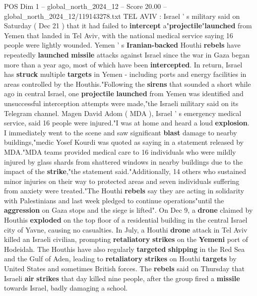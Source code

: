 \begin{textsample}{POS Dim 1 – global\_north\_2024\_12 – Score 20.00 – global\_north\_2024\_12/119143278.txt}  \label{ex:f1_pos_268}
TEL AVIV : Israel ' s military said on Saturday ( Dec 21 ) that it had failed to \textbf{intercept} a"\textbf{projectile}"\textbf{launched} from Yemen that landed in Tel Aviv, with the national medical service saying 16 people were lightly wounded.
Yemen ' s \textbf{Iranian-backed} Houthi \textbf{rebels} have repeatedly \textbf{launched} \textbf{missile} attacks against Israel since the war in Gaza began more than a year ago, most of which have been \textbf{intercepted}.
In return, Israel has \textbf{struck} multiple \textbf{targets} in Yemen - including ports and energy facilities in areas controlled by the Houthis."Following the \textbf{sirens} that sounded a short while ago in central Israel, one \textbf{projectile} \textbf{launched} from Yemen was identified and unsuccessful interception attempts were made,"the Israeli military said on its Telegram channel.
Magen David Adom ( MDA ), Israel ' s emergency medical service, said 16 people were injured."I was at home and heard a loud \textbf{explosion}.
I immediately went to the scene and saw significant \textbf{blast} damage to nearby buildings,"medic Yosef Kourdi was quoted as saying in a statement released by MDA."MDA teams provided medical care to 16 individuals who were mildly injured by glass shards from shattered windows in nearby buildings due to the impact of the \textbf{strike},"the statement said."Additionally, 14 others who sustained minor injuries on their way to protected areas and seven individuals suffering from anxiety were treated."The Houthi \textbf{rebels} say they are acting in solidarity with Palestinians and last week pledged to continue operations"until the \textbf{aggression} on Gaza stops and the siege is lifted".
On Dec 9, a \textbf{drone} claimed by Houthis \textbf{exploded} on the top floor of a residential building in the central Israel city of Yavne, causing no casualties.
In July, a Houthi \textbf{drone} attack in Tel Aviv killed an Israeli civilian, prompting \textbf{retaliatory} \textbf{strikes} on the \textbf{Yemeni} port of Hodeidah.
The Houthis have also regularly \textbf{targeted} \textbf{shipping} in the Red Sea and the Gulf of Aden, leading to \textbf{retaliatory} \textbf{strikes} on Houthi \textbf{targets} by United States and sometimes British forces.
The \textbf{rebels} said on Thursday that Israeli \textbf{air} \textbf{strikes} that day killed nine people, after the group fired a \textbf{missile} towards Israel, badly damaging a school.

\end{textsample}
